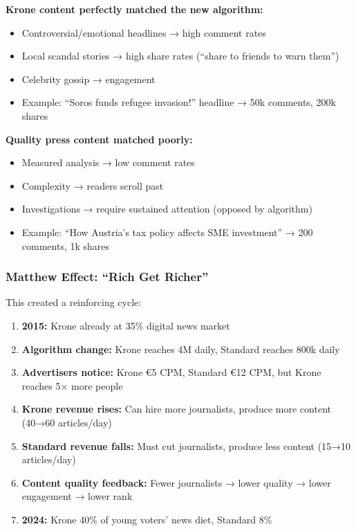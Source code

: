 {\textbf{Krone content perfectly matched the new algorithm:}

\begin{itemize}
\item Controversial/emotional headlines → high comment rates
\item Local scandal stories → high share rates (``share to friends to warn them'')
\item Celebrity gossip → engagement
\item Example: ``Soros funds refugee invasion!'' headline → 50k comments, 200k shares
\end{itemize}

\textbf{Quality press content matched poorly:}

\begin{itemize}
\item Measured analysis → low comment rates
\item Complexity → readers scroll past
\item Investigations → require sustained attention (opposed by algorithm)
\item Example: ``How Austria's tax policy affects SME investment'' → 200 comments, 1k shares
\end{itemize}

\subsubsection*{Matthew Effect: ``Rich Get Richer''}

This created a reinforcing cycle:

\begin{enumerate}
\item \textbf{2015:} Krone already at 35\% digital news market
\item \textbf{Algorithm change:} Krone reaches 4M daily, Standard reaches 800k daily
\item \textbf{Advertisers notice:} Krone €5 CPM, Standard €12 CPM, but Krone reaches 5× more people
\item \textbf{Krone revenue rises:} Can hire more journalists, produce more content (40→60 articles/day)
\item \textbf{Standard revenue falls:} Must cut journalists, produce less content (15→10 articles/day)
\item \textbf{Content quality feedback:} Fewer journalists → lower quality → lower engagement → lower rank
\item \textbf{2024:} Krone 40\% of young voters' news diet, Standard 8\%
\end{enumerate}

}

